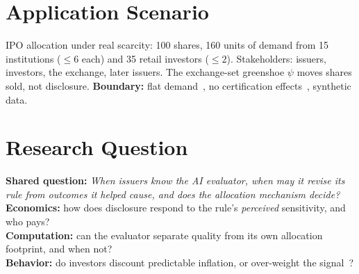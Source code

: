\section{Application Scenario}
IPO allocation under real scarcity: 100 shares, 160 units of demand from 15 institutions ($\le6$ each) and 35 retail investors ($\le2$). Stakeholders: issuers, investors, the exchange, later issuers. The exchange-set greenshoe $\psi$ moves shares sold, not disclosure. \textbf{Boundary:} flat demand~\cite{ausubel2014}, no certification effects~\cite{benveniste1989}, synthetic data.

\section{Research Question}
\textbf{Shared question:} \emph{When issuers know the AI evaluator, when may it revise its rule from outcomes it helped cause, and does the allocation mechanism decide?}\\
\textbf{Economics:} how does disclosure respond to the rule's \emph{perceived} sensitivity, and who pays?\\
\textbf{Computation:} can the evaluator separate quality from its own allocation footprint, and when not?\\
\textbf{Behavior:} do investors discount predictable inflation, or over-weight the signal~\cite{logg2019}?


